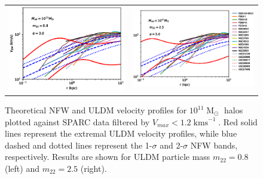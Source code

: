\documentclass[a4paper,11pt]{article}
\begin{document}
\begin{figure}
\begin{tabular}{cc}
{\includegraphics[scale = 0.65, trim={2.5cm 2.5cm 2.1cm 0.5cm}]{pics/v_11_8_3_paper.eps}} &
{\includegraphics[scale = 0.65, trim={2.1cm 2.5cm 0cm 0.5cm}]{pics/v_11_25_3_paper.eps}}
\end{tabular}
\caption{Theoretical NFW and ULDM velocity profiles for $10^{11}\operatorname{M}_{\odot}$ halos plotted against SPARC data filtered by $V_{max} < 1.2 \operatorname{kms}^{-1}$. Red solid lines represent the extremal ULDM velocity profiles, while  blue dashed and dotted lines represent the 1-$\sigma$ and 2-$\sigma$ NFW bands, respectively. Results are shown for ULDM particle mass $m_{22} = 0.8$ (left) and $m_{22} = 2.5 $ (right). }\label{fig:velocity_11}
\end{figure}
\end{document}
